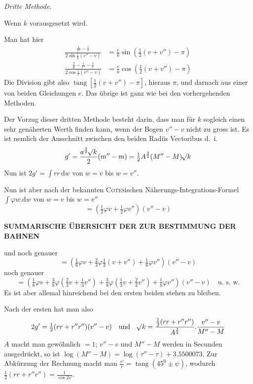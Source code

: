 \par\medskip\noindent\hspace*{1.5em}\emph{Dritte Methode.}\par\nobreak
\indent Wenn $k$ vorausgesetzt wird.\par
\indent Man hat hier
\[
\begin{aligned}
\frac{\frac1{r''}-\frac1r}{2\sin\tfrac12(v''-v)}&=\frac ek\sin(\tfrac12(v+v'')-\pi)\\
\frac{\frac2k-\frac1{r''}-\frac1r}{2\cos\tfrac12(v''-v)}&=\frac ek\cos(\tfrac12(v+v'')-\pi)
\end{aligned}
\]
Die Division gibt also $\operatorname{tang}[\tfrac12(v+v'')-\pi]$, hieraus $\pi$, und darnach aus einer von beiden Gleichungen $e$. Das übrige ist ganz wie bei den vorhergehenden Methoden.

Der Vorzug dieser dritten Methode besteht darin, dass man für $k$ sogleich einen sehr genäherten Werth finden kann, wenn der Bogen $v''-v$ nicht zu gross ist. Es ist nemlich der Ausschnitt zwischen den beiden Radiis Vectoribus d.\ i.
\[
g'=\frac{a^{\frac32}\mathord{{}^{}\!\surd}k}2(m''-m)=\tfrac12A^{\frac32}(M''-M)\mathord{{}^{}\!\surd}k
\]
Nun ist $2g'=\int rr\,\mathrm{d}w$ von $w=v$ bis $w=v''$.

Nun ist aber nach der bekannten \textsc{Cotes}ischen Näherungs-Integrations-Formel $\int\varphi w.\mathrm{d}w$ von $w=v$ bis $w=v''$
\[
=(\tfrac12\varphi v+\tfrac12\varphi v'')(v''-v)
\]
\clearpage
\thispagestyle{empty}
\noindent{}%
%
\parbox[t]{\dimexpr\linewidth-24mm\relax}{\centering\fontsize{7.4}{9.2}\selectfont\bfseries SUMMARISCHE ÜBERSICHT DER ZUR BESTIMMUNG DER BAHNEN\par}%
\makebox[12mm][r]{}\par\nobreak\smallskip
\noindent und noch genauer
\[
=(\tfrac16\varphi v+\tfrac23\varphi\tfrac12(v+v'')+\tfrac16\varphi v'')(v''-v)
\]
noch genauer
\[
=(\tfrac18\varphi v+\tfrac38\varphi(\tfrac23v+\tfrac13v'')+\tfrac38\varphi(\tfrac13v+\tfrac23v'')+\tfrac18\varphi v'')(v''-v)\quad\text{u.\ s.\ w.}
\]
Es ist aber allemal hinreichend bei den ersten beiden stehen zu bleiben.

Nach der ersten hat man also
\[
2g'=\tfrac12(rr+r''r'')(v''-v)\quad\text{und}\quad\mathord{{}^{}\!\surd}k=\frac{\tfrac12(rr+r''r'')}{A^{\frac32}}.\frac{v''-v}{M''-M}
\]
$A$ macht man gewöhnlich $=1$; $v''-v$ und $M''-M$ werden in Secunden ausgedrückt, so ist $\log(M''-M)=\log(\tau''-\tau)+3.5500073$. Zur Abkürzung der Rechnung macht man $\frac{r'}r=\operatorname{tang}(45^0\pm\psi)$, wodurch $\tfrac12(rr+r''r'')=\frac1{\cos2\psi}$.

